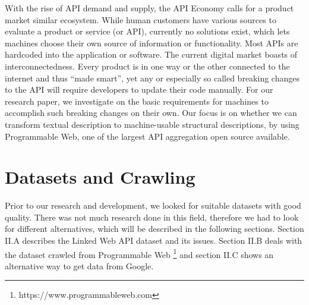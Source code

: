 \documentclass[a4paper]{IEEEtran}
\begin{document}
With the rise of API demand and supply, the API Economy calls for a product market similar ecosystem. While human customers have various sources to evaluate a product or service (or API), currently no solutions exist, which lets machines choose their own source of information or functionality. Most APIs are hardcoded into the application or software. The current digital market boasts of interconnectedness. Every product is in one way or the other connected to the internet and thus “made smart”, yet any or especially so called breaking changes to the API will require developers to update their code manually. 
For our research paper, we investigate on the basic requirements for machines to accomplish such breaking changes on their own. Our focus is on whether we can transform textual description to machine-usable structural descriptions, by using Programmable Web, one of the largest API aggregation open source available.

\section{Datasets and Crawling}
Prior to our research and development, we looked for suitable datasets with good quality. There was not much research done in this field, therefore we had to look for different alternatives, which will be described in the following sections. Section II.A describes the Linked Web API dataset and its issues. Section II.B deals with the dataset crawled from Programmable Web  \footnote[1]{https://www.programmableweb.com} and section II.C shows an alternative way to get data from Google.
\end{document}
